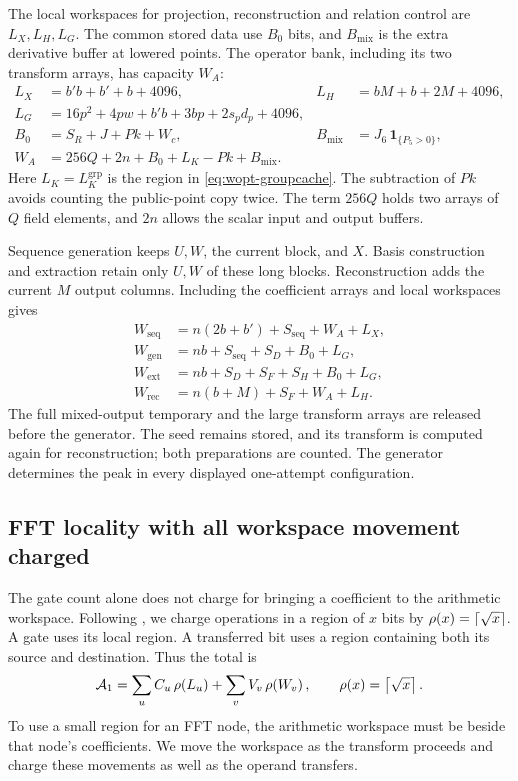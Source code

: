 \documentclass[b5paper, 10pt, abstract=true, captions=tableheading]{scrartcl}
\theoremstyle{plain}
\theoremstyle{definition}
\begin{document}
The local workspaces for projection, reconstruction and relation control
are $L_X,L_H,L_G$. The common stored data use $B_0$ bits, and $B_{\mathrm{mix}}$
is the extra derivative buffer at lowered points. The operator bank,
including its two transform arrays, has capacity $W_A$:
\[
 \begin{aligned}
 L_X&=b' b+b'+b+4096,&
 L_H&=bM+b+2M+4096,\\
 L_G&=16p^2+4pw+b' b+3bp+2s_pd_p+4096,\\
 B_0&=S_R+J+Pk+W_c,\qquad&
 B_{\mathrm{mix}}&=J_6\,\mathbf1_{\{P_5>0\}},\\
 W_A&=256Q+2n+B_0+L_K-Pk+B_{\mathrm{mix}}.
 \end{aligned}
\]
Here $L_K=L_K^{\mathrm{grp}}$ is the region in
\eqref{eq:wopt-groupcache}. The subtraction of $Pk$ avoids counting the
public-point copy twice. The term $256Q$ holds two arrays of $Q$ field
elements, and $2n$ allows the scalar input and output buffers.

Sequence generation keeps $U,W$, the current block, and $X$. Basis
construction and extraction retain only $U,W$ of these long blocks.
Reconstruction adds the current $M$ output columns. Including the
coefficient arrays and local workspaces gives
\begin{equation}
 \begin{split}
 W_{\mathrm{seq}}&=n(2b+b')+S_{\mathrm{seq}}+W_A+L_X,\\
 W_{\mathrm{gen}}&=nb+S_{\mathrm{seq}}+S_D+B_0+L_G,\\
 W_{\mathrm{ext}}&=nb+S_D+S_F+S_H+B_0+L_G,\\
 W_{\mathrm{rec}}&=n(b+M)+S_F+W_A+L_H .
 \end{split}
 \label{eq:wopt-phase}
\end{equation}
The full mixed-output temporary and the large transform arrays are released
before the generator. The seed remains stored, and its transform is
computed again for reconstruction; both preparations are counted. The generator determines the peak in every
displayed one-attempt configuration.

\subsection{FFT locality with all workspace movement charged}
\label{sec:wopt-locality}
The gate count alone does not charge for bringing a coefficient to the
arithmetic workspace. Following \cite[Section 6]{Weis2026}, we charge
operations in a region of $x$ bits by $\rho(x)=\left\lceil \sqrt{x}\right\rceil$.
A gate uses its local region. A transferred bit uses a region containing
both its source and destination. Thus the total is
\begin{equation}
 \mathcal A_1=\sum_u C_u\,\rho\!\left(L_u\right)
                  +\sum_v V_v\,\rho\!\left(W_v\right),
 \qquad \rho(x)=\left\lceil \sqrt{x}\right\rceil.
 \label{eq:wopt-accessmodel}
\end{equation}
To use a small region for an FFT node, the arithmetic workspace must be
beside that node's coefficients. We move the workspace as the transform
proceeds and charge these movements as well as the operand transfers.
\end{document}
